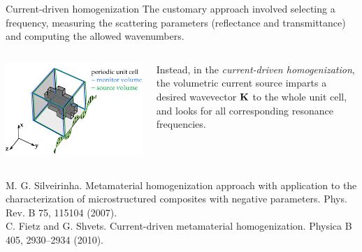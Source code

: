 \documentclass[t]{beamer} \usepackage[english]{babel} \usepackage[utf8]{inputenc} \usetheme{Frankfurt} %
\begin{document}
\begin{frame}{Current-driven homogenization}%
The customary approach involved selecting a frequency, measuring the scattering parameters (reflectance and transmittance) and computing the allowed wavenumbers.
 \vspace{.2em}

\begin{columns}[T] %
	\begin{column}{.5\textwidth}
		\hfill\includegraphics[width=.9\textwidth]{../img/cdh_geometry.pdf}
	\end{column}
	\begin{column}{.5\textwidth}
	\vspace{3mm}
	\noindent Instead, in the \textit{current-driven homogenization}, the volumetric current source imparts a desired wavevector ${\mathbf{K}}$ to the whole unit cell, and looks for all corresponding resonance frequencies.
\end{column}%
\end{columns}
 \vspace{.2em}


\vfill 
\begin{tiny}
M. G. Silveirinha. Metamaterial homogenization approach with application to the characterization of microstructured composites with negative parameters. Phys. Rev. B 75, 115104 (2007). \\
C. Fietz and G. Shvets. Current-driven metamaterial homogenization. Physica B 405, 2930–2934 (2010).
\end{tiny}
\end{frame} 		%
\end{document}
